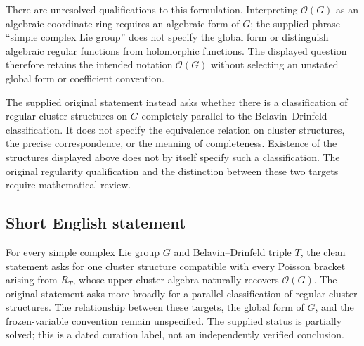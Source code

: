 \documentclass[11pt]{article}
\begin{document}
There are unresolved qualifications to this formulation. Interpreting \(\mathcal O(G)\) as an algebraic coordinate ring requires an algebraic form of \(G\); the supplied phrase ``simple complex Lie group'' does not specify the global form or distinguish algebraic regular functions from holomorphic functions. The displayed question therefore retains the intended notation \(\mathcal O(G)\) without selecting an unstated global form or coefficient convention.

The supplied original statement instead asks whether there is a classification of regular cluster structures on \(G\) completely parallel to the Belavin--Drinfeld classification. It does not specify the equivalence relation on cluster structures, the precise correspondence, or the meaning of completeness. Existence of the structures displayed above does not by itself specify such a classification. The original regularity qualification and the distinction between these two targets require mathematical review.
\subsection{Short English statement}
For every simple complex Lie group \(G\) and Belavin--Drinfeld triple \(T\), the clean statement asks for one cluster structure compatible with every Poisson bracket arising from \(R_T\), whose upper cluster algebra naturally recovers \(\mathcal O(G)\). The original statement asks more broadly for a parallel classification of regular cluster structures. The relationship between these targets, the global form of \(G\), and the frozen-variable convention remain unspecified. The supplied status is partially solved; this is a dated curation label, not an independently verified conclusion.
\end{document}
